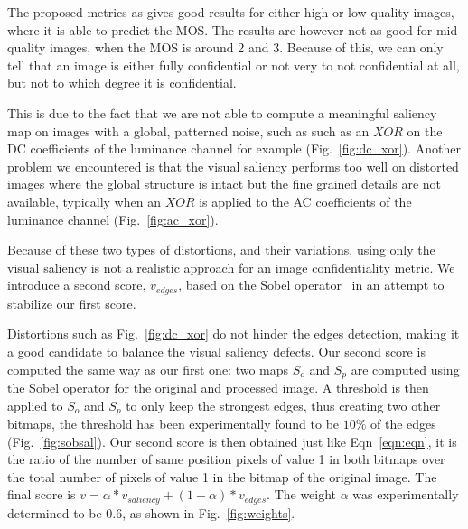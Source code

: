 \documentclass{article}
\begin{document}

The proposed metrics as gives good results for either high or low quality images, where it is able to predict the MOS. The results are however not as good for mid quality images, when the MOS is around 2 and 3. Because of this, we can only tell that an image is either fully confidential or not very to not confidential at all, but not to which degree it is confidential.

This is due to the fact that we are not able to compute a meaningful saliency map on images with a global, patterned noise, such as such as an $XOR$ on the DC coefficients of the luminance channel for example (Fig.~\ref{fig:dc_xor}). Another problem we encountered is that the visual saliency performs too well on distorted images where the global structure is intact but the fine grained details are not available, typically when an $XOR$ is applied to the AC coefficients of the luminance channel (Fig.~\ref{fig:ac_xor}).

Because of these two types of distortions, and their variations, using only the visual saliency is not a realistic approach for an image confidentiality metric. We introduce a second score, $v_{edges}$, based on the Sobel operator~\cite{sobel1990isotropic} in an attempt to stabilize our first score.

Distortions such as Fig.~\ref{fig:dc_xor} do not hinder the edges detection, making it a good candidate to balance the visual saliency defects. Our second score is computed the same way as our first one: two maps $S_o$ and $S_p$ are computed using the Sobel operator for the original and processed image. A threshold is then applied to $S_o$ and $S_p$ to only keep the strongest edges, thus creating two other bitmaps, the threshold has been experimentally found to be $10\%$ of the edges (Fig.~\ref{fig:sobsal}). Our second score is then obtained just like Eqn~\ref{eqn:eqn}, it is the ratio of the number of same position pixels of value 1 in both bitmaps over the total number of pixels of value 1 in the bitmap of the original image. The final score is $v = \alpha * v_{saliency} + (1 - \alpha) * v_{edges}$. The weight $\alpha$ was experimentally determined to be $0.6$, as shown in Fig.~\ref{fig:weights}.
\end{document}
